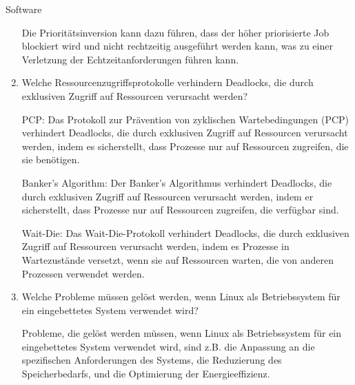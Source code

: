 \documentclass{article}
\begin{document}
\begin{exercise}{Software}
\begin{enumerate}
\begin{solution}
            Die Prioritätsinversion kann dazu führen, dass der höher priorisierte Job blockiert wird und nicht rechtzeitig ausgeführt werden kann, was zu einer Verletzung der Echtzeitanforderungen führen kann.
          \end{solution}

    \item Welche Ressourcenzugriffsprotokolle verhindern Deadlocks, die durch exklusiven Zugriff auf Ressourcen verursacht werden?

          \begin{solution}
            PCP: Das Protokoll zur Prävention von zyklischen Wartebedingungen (PCP) verhindert Deadlocks, die durch exklusiven Zugriff auf Ressourcen verursacht werden, indem es sicherstellt, dass Prozesse nur auf Ressourcen zugreifen, die sie benötigen.

            Banker's Algorithm: Der Banker's Algorithmus verhindert Deadlocks, die durch exklusiven Zugriff auf Ressourcen verursacht werden, indem er sicherstellt, dass Prozesse nur auf Ressourcen zugreifen, die verfügbar sind.

            Wait-Die: Das Wait-Die-Protokoll verhindert Deadlocks, die durch exklusiven Zugriff auf Ressourcen verursacht werden, indem es Prozesse in Wartezustände versetzt, wenn sie auf Ressourcen warten, die von anderen Prozessen verwendet werden.
          \end{solution}

    \item Welche Probleme müssen gelöst werden, wenn Linux als Betriebssystem für ein eingebettetes System verwendet wird?

          \begin{solution}
            Probleme, die gelöst werden müssen, wenn Linux als Betriebssystem für ein eingebettetes System verwendet wird, sind z.B. die Anpassung an die spezifischen Anforderungen des Systems, die Reduzierung des Speicherbedarfs, und die Optimierung der Energieeffizienz.
          \end{solution}
  \end{enumerate}
\end{exercise}
\end{document}

